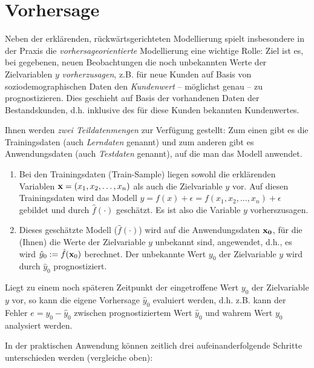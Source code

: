 \documentclass[
]{book}
\begin{document}
\hypertarget{vorhersage}{%
\section{Vorhersage}\label{vorhersage}}

Neben der erklärenden, rückwärtsgerichteten Modellierung spielt insbesondere in der Praxis die \emph{vorhersageorientierte} Modellierung eine wichtige Rolle:
Ziel ist es, bei gegebenen, neuen Beobachtungen die noch unbekannten Werte der Zielvariablen \(y\) \emph{vorherzusagen}, z.B. für neue Kunden auf Basis von soziodemographischen Daten den \emph{Kundenwert} -- möglichst genau -- zu prognostizieren.
Dies geschieht auf Basis der vorhandenen Daten der Bestandskunden,
d.h. inklusive des für diese Kunden bekannten Kundenwertes.

Ihnen werden \emph{zwei Teildatenmengen} zur Verfügung gestellt:
Zum einen gibt es die Trainingsdaten (auch \emph{Lerndaten} genannt) und zum anderen gibt es Anwendungsdaten (auch \emph{Testdaten} genannt), auf die man das Modell anwendet.

\begin{enumerate}
\def\labelenumi{\arabic{enumi}.}
\item
  Bei den Trainingsdaten (Train-Sample) liegen sowohl die erklärenden Variablen \({\bf{x}} = (x_1, x_2, \ldots, x_n)\) als auch die Zielvariable \(y\) vor.
  Auf diesen Trainingsdaten wird das Modell \(y=f({x})+\epsilon = f(x_1, x_2, \ldots, x_n)+\epsilon\) gebildet und durch \(\hat{f}(\cdot)\) geschätzt. Es ist also die Variable \(y\) vorherszusagen.
\item
  Dieses geschätzte Modell (\(\hat{f}(\cdot)\)) wird auf die Anwendungsdaten \(\bf{x}_0\), für die (Ihnen) die Werte der Zielvariable \(y\) unbekannt sind, angewendet, d.h., es wird \(\hat{y}_0 :=\hat{f}({\bf{x}}_0)\) berechnet.
  Der unbekannte Wert \(y_0\) der Zielvariable \(y\) wird durch \(\hat{y}_0\) prognostiziert.
\end{enumerate}

Liegt zu einem noch späteren Zeitpunkt der eingetroffene Wert \(y_0\) der Zielvariable \(y\) vor, so kann die eigene Vorhersage \(\hat{y}_0\) evaluiert werden,
d.h. z.B. kann der Fehler \(e=y_0-\hat{y}_0\) zwischen prognostiziertem Wert \(\hat{y}_0\) und wahrem Wert \(y_0\) analysiert werden.

In der praktischen Anwendung können zeitlich drei aufeinanderfolgende Schritte unterschieden werden (vergleiche oben):
\end{document}
